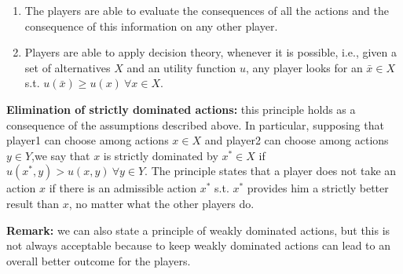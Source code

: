 \begin{enumerate}
\begin{enumerate}
		\item The players are able to evaluate the consequences of all the 
		actions and the consequence of this information on any other player.

		\item Players are able to apply decision theory, whenever it is 
		possible, i.e., given a set of alternatives $X$ and an utility function 
		$u$, any player looks for an $\bar{x} \in X$ s.t. 
		$u(\bar{x}) \geq u(x) ~\forall x \in X$.
	\end{enumerate}	
\end{enumerate}

\noindent \textbf{Elimination of strictly dominated actions:} this principle 
holds as a consequence of the assumptions described above. In particular, 
supposing that player1 can choose among actions $x \in X$ and player2 can 
choose among actions $y \in Y$,we say that $x$ is strictly dominated by 
$x^* \in X$ if $u(x^*,y) > u(x,y) ~\forall y \in Y$. The principle states that 
a player does not take an action $x$ if there is an admissible action $x^*$ s.t. 
$x^*$ provides him a strictly better result than $x$, no matter what the other 
players do.

\noindent \textbf{Remark:} we can also state a principle of weakly dominated 
actions, but this is not always acceptable because to keep weakly dominated 
actions can lead to an overall better outcome for the players.

%
